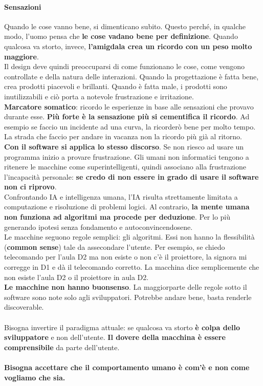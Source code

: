 \documentclass[10pt]{article}
\begin{document}
\paragraph{Sensazioni} Quando le cose vanno bene, si dimenticano subito. Questo perché, in qualche modo, l'uomo pensa che \textbf{le cose vadano bene per definizione}. Quando qualcosa va storto, invece, \textbf{l'amigdala crea un ricordo con un peso molto maggiore}.\\
Il design deve quindi preoccuparsi di come funzionano le cose, come vengono controllate e della natura delle interazioni. Quando la progettazione è fatta bene, crea prodotti piacevoli e brillanti. Quando è fatta male, i prodotti sono inutilizzabili e ciò porta a notevole frustrazione e irritazione.\\
\textbf{Marcatore somatico}: ricordo le esperienze in base alle sensazioni che provavo durante esse. \textbf{Più forte è la sensazione più si cementifica il ricordo}. Ad esempio se faccio un incidente ad una curva, la ricorderò bene per molto tempo. La strada che faccio per andare in vacanza non la ricordo più già al ritorno.\\
\textbf{Con il software si applica lo stesso discorso}. Se non riesco ad usare un programma inizio a provare frustrazione. Gli umani non informatici tengono a ritenere le macchine come superintelligenti, quindi associano alla frustrazione l'incapacità personale: \textbf{se credo di non essere in grado di usare il software non ci riprovo}.\\
Confrontando IA e intelligenza umana, l'IA risulta strettamente limitata a computazione e risoluzione di problemi logici. Al contrario, \textbf{la mente umana non funziona ad algoritmi ma procede per deduzione}. Per lo più generando ipotesi senza fondamento e autoconvincendosene.\\
Le macchine seguono regole semplici: gli algoritmi. Essi non hanno la flessibilità (\textbf{common sense}) tale da assecondare l'utente. Per esempio, se chiedo telecomando per l'aula D2 ma non esiste o non c'è il proiettore, la signora mi corregge in D1 e dà il telecomando corretto. La macchina dice semplicemente che non esiste l'aula D2 o il proiettore in aula D2.\\
\textbf{Le macchine non hanno buonsenso}. La maggiorparte delle regole sotto il software sono note solo agli sviluppatori. Potrebbe andare bene, basta renderle discoverable.\\\\
Bisogna invertire il paradigma attuale: se qualcosa va storto \textbf{è colpa dello sviluppatore} e non dell'utente. \textbf{Il dovere della macchina è essere comprensibile} da parte dell'utente.\\\\\textbf{Bisogna accettare che il comportamento umano è com'è e non come vogliamo che sia.}
\end{document}
